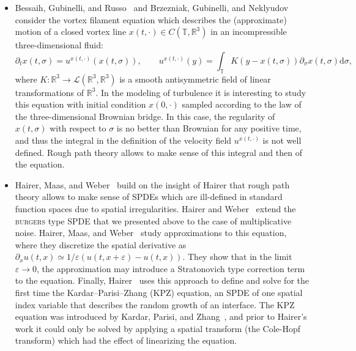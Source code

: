 \documentclass[a4paper,11pt]{article}
\newcommand{\mathd}{\mathrm{d}}
\theoremstyle{remark}
\begin{document}
\begin{itemize}
\item[--]
Bessaih, Gubinelli, and Russo~\cite{Bessaih2005} and Brzezniak, Gubinelli, and Neklyudov \cite{Brzezniak2010} consider the vortex filament equation which describes the (approximate) motion of a closed vortex line $x(t,\cdot)\in C(\mathbb{T},\mathbb{R}^3)$ in an incompressible three-dimensional fluid:
\[
\partial_t x(t,\sigma) = u^{x(t,\cdot)}(x(t,\sigma)),\qquad u^{x(t,\cdot)}(y) = \int_{\mathbb{T}} K(y-x(t,\sigma)) \partial_\sigma x(t,\sigma) \mathd \sigma,
\]
where $K:\mathbb{R}^3 \to \mathcal{L}(\mathbb{R}^3,\mathbb{R}^3)$ is a smooth antisymmetric field of linear transformations of $\mathbb{R}^3$. In the modeling of turbulence it is interesting to study this equation with initial condition $x(0,\cdot)$ sampled according to the law of the three-dimensional Brownian bridge. In this case, the regularity of $x(t,\sigma)$ with respect to $\sigma$ is no better than Brownian for any positive time, and thus the integral in the definition of the velocity field $u^{x(t,\cdot)}$ is not well defined. Rough path theory allows to make sense of this integral and then of the equation.%

\item[--]
Hairer, Maas, and Weber~\cite{Hairer2011, Hairer2013, Hairer2013b, Hairer2012} build on the insight of Hairer that rough path theory allows to make sense of SPDEs which are ill-defined in standard function spaces due to spatial irregularities. Hairer and Weber~\cite{Hairer2013} extend the \textsc{burgers} type SPDE that we presented above to the case of multiplicative noise. Hairer, Maas, and Weber~\cite{Hairer2012} study approximations to this equation, where they discretize the spatial derivative as $\partial_x u(t,x) \simeq 1/\varepsilon (u(t,x+\varepsilon) - u(t,x))$. They show that in the limit $\varepsilon \rightarrow 0$, the approximation may introduce a Stratonovich type correction term to the equation. Finally, Hairer~\cite{Hairer2013b} uses this approach to  define and solve for the first time the Kardar--Parisi--Zhang (KPZ) equation, an SPDE of one spatial index variable that describes the random growth of an interface. The KPZ equation was introduced by Kardar, Parisi, and Zhang~\cite{Kardar1986}, and prior to Hairer's work it could only be solved by applying a spatial transform (the Cole-Hopf transform) which had the effect of linearizing the equation.
\end{itemize}
\end{document}
